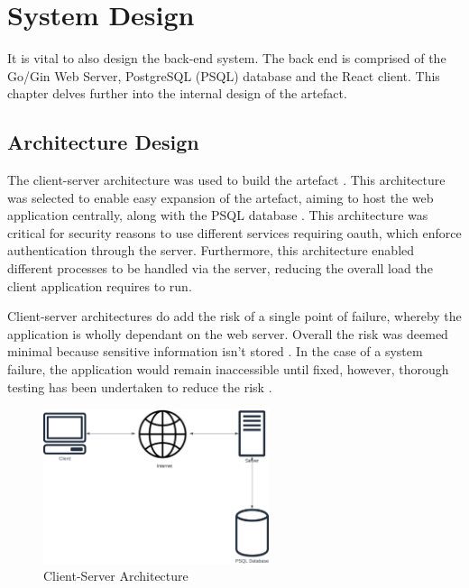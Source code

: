 \section{System Design}
\label{design:system}

It is vital to also design the back-end system. The back end is comprised of the Go/Gin Web Server, PostgreSQL (PSQL) database and the React client. This chapter delves further into the internal design of the artefact. 

\subsection{Architecture Design}
\label{system:architecture-design}

The client-server architecture was used to build the artefact . This architecture was selected to enable easy expansion of the artefact, aiming to host the web application centrally, along with the PSQL database . This architecture was critical for security reasons to use different services requiring oauth, which enforce authentication through the server. Furthermore, this architecture enabled different processes to be handled via the server, reducing the overall load the client application requires to run.

Client-server architectures do add the risk of a single point of failure, whereby the application is wholly dependant on the web server. Overall the risk was deemed minimal because sensitive information isn't stored . In the case of a system failure, the application would remain inaccessible until fixed, however, thorough testing has been undertaken to reduce the risk .

\clearpage
\begin{figure}[!ht]
  \centering
  \includegraphics[width=250px]{figures/client-server.png}
  \caption{Client-Server Architecture}
  \label{fig:clientserver}
\end{figure}

